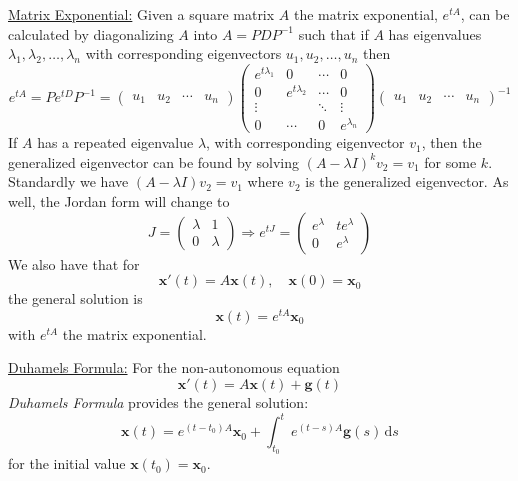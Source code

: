 \documentclass{exam}
\begin{document}
    \underline{Matrix Exponential:} Given a square matrix $A$ the matrix exponential, $e^{tA}$, can be calculated by diagonalizing $A$ into $A=PDP^{-1}$ such that if $A$ has eigenvalues $\lambda_1, \lambda_2, \ldots, \lambda_n$ with corresponding eigenvectors $u_1, u_2, \ldots, u_n$ then 
    \[
        e^{tA} = Pe^{tD}P^{-1} = \begin{pmatrix}
            u_1 & u_2 & \cdots & u_n
        \end{pmatrix}  
        \begin{pmatrix}
            e^{t\lambda_1} & 0 & \cdots & 0 \\
            0 & e^{t\lambda_2} & \cdots & 0 \\
            \vdots & & \ddots &  \vdots \\
            0 & \cdots & 0 & e^{\lambda_n}
        \end{pmatrix}
        \begin{pmatrix}
            u_1 & u_2 & \cdots & u_n
        \end{pmatrix}^{-1}
    \]
    If $A$ has a repeated eigenvalue $\lambda$, with corresponding eigenvector $v_1$, then the generalized eigenvector can be found by solving $(A - \lambda I)^{k}v_2 = v_1$ for some $k$. Standardly we have $(A - \lambda I)v_2 = v_1$ where $v_2$ is the generalized eigenvector. As well, the Jordan form will change to 
    \[
        J = \begin{pmatrix}
            \lambda & 1 \\
            0 & \lambda
        \end{pmatrix} 
        \Rightarrow e^{tJ} = \begin{pmatrix}
            e^{\lambda} & te^{\lambda} \\
            0 & e^{\lambda}
        \end{pmatrix}
    \]
    We also have that for 
    \[
        \mathbf{x}'(t) = A\mathbf{x}(t), \quad \mathbf{x}(0) = \mathbf{x}_0
    \]
    the general solution is 
    \[
        \mathbf{x}(t) = e^{tA}\mathbf{x}_0
    \]
    with $e^{tA}$ the matrix exponential.

    \underline{Duhamels Formula:} For the non-autonomous equation 
    \[
        \mathbf{x}'(t) = A\mathbf{x}(t) + \mathbf{g}(t)
    \]
    \textit{Duhamels Formula} provides the general solution: 
    \[
        \mathbf{x}(t) = e^{(t - t_0)A}\mathbf{x}_0 + \int_{t_0}^t e^{(t-s)A}\mathbf{g}(s)\,\mathrm{d}s
    \]
    for the initial value $\mathbf{x}(t_0)= \mathbf{x}_0$.
\end{document}
